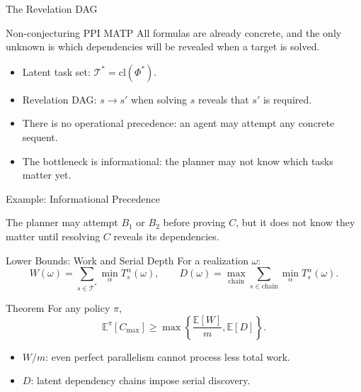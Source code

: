 \documentclass[10pt,aspectratio=169]{beamer}
\begin{document}
\begin{frame}{The Revelation DAG}
\small
\begin{block}{Non-conjecturing PPI MATP}
All formulas are already concrete, and the only unknown is which dependencies will be revealed when a target is solved.
\end{block}

\begin{itemize}
  \item Latent task set: $\mathcal{T}^*=\mathrm{cl}(\Phi^*)$.
  \item Revelation DAG: $s\to s'$ when solving $s$ reveals that $s'$ is required.
  \item There is no operational precedence: an agent may attempt any concrete sequent.
  \item The bottleneck is informational: the planner may not know which tasks matter yet.
\end{itemize}
\end{frame}

\begin{frame}{Example: Informational Precedence}
\small
\begin{center}
\end{center}

\small
The planner may attempt $B_1$ or $B_2$ before proving $C$, but it does not know they matter until resolving $C$ reveals its dependencies.
\end{frame}

\begin{frame}{Lower Bounds: Work and Serial Depth}
\small
For a realization $\omega$:
\[
W(\omega)=\sum_{s\in\mathcal{T}^*}\min_\alpha T^\alpha_s(\omega),
\qquad
D(\omega)=\max_{\text{chain}}\sum_{s\in\text{chain}}\min_\alpha T^\alpha_s(\omega).
\]

\begin{block}{Theorem}
For any policy $\pi$,
\[
\mathbb{E}^\pi[C_{\max}]\ge
\max\left\{\frac{\mathbb{E}[W]}{m},\mathbb{E}[D]\right\}.
\]
\end{block}

\begin{itemize}
  \item $W/m$: even perfect parallelism cannot process less total work.
  \item $D$: latent dependency chains impose serial discovery.
\end{itemize}
\end{frame}
\end{document}
